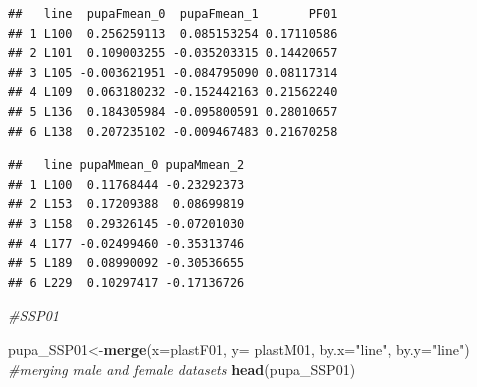 \documentclass[
]{article}
\newenvironment{Shaded}{\begin{snugshade}}{\end{snugshade}}
\newcommand{\CommentTok}[1]{\textcolor[rgb]{0.56,0.35,0.01}{\textit{#1}}}
\newcommand{\DataTypeTok}[1]{\textcolor[rgb]{0.13,0.29,0.53}{#1}}
\newcommand{\DecValTok}[1]{\textcolor[rgb]{0.00,0.00,0.81}{#1}}
\newcommand{\KeywordTok}[1]{\textcolor[rgb]{0.13,0.29,0.53}{\textbf{#1}}}
\newcommand{\NormalTok}[1]{#1}
\newcommand{\OperatorTok}[1]{\textcolor[rgb]{0.81,0.36,0.00}{\textbf{#1}}}
\newcommand{\StringTok}[1]{\textcolor[rgb]{0.31,0.60,0.02}{#1}}
\begin{document}
\begin{verbatim}
##   line  pupaFmean_0  pupaFmean_1       PF01
## 1 L100  0.256259113  0.085153254 0.17110586
## 2 L101  0.109003255 -0.035203315 0.14420657
## 3 L105 -0.003621951 -0.084795090 0.08117314
## 4 L109  0.063180232 -0.152442163 0.21562240
## 5 L136  0.184305984 -0.095800591 0.28010657
## 6 L138  0.207235102 -0.009467483 0.21670258
\end{verbatim}

\begin{Shaded}
\end{Shaded}

\begin{verbatim}
##   line pupaMmean_0 pupaMmean_2
## 1 L100  0.11768444 -0.23292373
## 2 L153  0.17209388  0.08699819
## 3 L158  0.29326145 -0.07201030
## 4 L177 -0.02499460 -0.35313746
## 5 L189  0.08990092 -0.30536655
## 6 L229  0.10297417 -0.17136726
\end{verbatim}

\begin{Shaded}
\end{Shaded}

\begin{Shaded}
\begin{Highlighting}[]
\CommentTok{#SSP01}

\NormalTok{pupa_SSP01<-}\KeywordTok{merge}\NormalTok{(}\DataTypeTok{x=}\NormalTok{plastF01, }\DataTypeTok{y=}\NormalTok{ plastM01, }\DataTypeTok{by.x=}\StringTok{"line"}\NormalTok{, }\DataTypeTok{by.y=}\StringTok{"line"}\NormalTok{) }\CommentTok{#merging male and female datasets}
\KeywordTok{head}\NormalTok{(pupa_SSP01)}
\end{Highlighting}
\end{Shaded}
\end{document}
